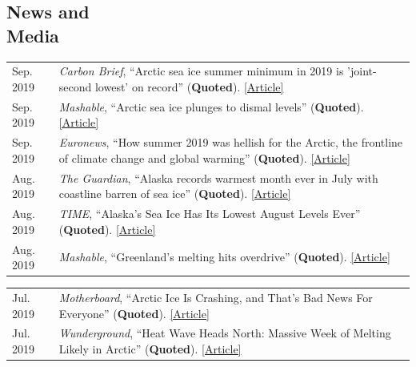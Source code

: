 \documentclass[margin,line,palatino,courier,10pt]{res}
\begin{document}
\begin{resume}
\section{\sc \textcolor{Cerulean}{\large{\textbf{News and\\ Media}}}}
\vspace*{0.04in}
\begin{tabular}{@{}p{0.9in}p{4in}}
Sep. 2019 & \textit{Carbon Brief}, ``Arctic sea ice summer minimum in 2019 is 'joint-second lowest' on record'' (\textbf{Quoted}). \href{https://www.carbonbrief.org/arctic-sea-ice-minimum-in-2019-is-joint-second-lowest-on-record}{[Article]}\\
Sep. 2019 & \textit{Mashable}, ``Arctic sea ice plunges to dismal levels'' (\textbf{Quoted}). \href{https://mashable.com/article/arctic-sea-ice-2019-melt/}{[Article]}\\
Sep. 2019 & \textit{Euronews}, ``How summer 2019 was hellish for the Arctic, the frontline of climate change and global warming'' (\textbf{Quoted}). \href{https://www.euronews.com/2019/09/18/how-2019-was-hellish-for-the-arctic-the-frontline-of-climate-change-and-global-warming}{[Article]}\\
Aug. 2019 & \textit{The Guardian}, ``Alaska records warmest month ever in July with coastline barren of sea ice'' (\textbf{Quoted}). \href{https://www.theguardian.com/us-news/2019/aug/08/alaska-warmest-month-ever-july-2019-sea-ice}{[Article]}\\
Aug. 2019 & \textit{TIME}, ``Alaska's Sea Ice Has Its Lowest August Levels Ever'' (\textbf{Quoted}). \href{https://time.com/5646168/alaska-sea-ice-melted/}{[Article]}\\
Aug. 2019 & \textit{Mashable}, ``Greenland's melting hits overdrive'' (\textbf{Quoted}). \href{https://mashable.com/article/greenland-melting-spike-climate-change/}{[Article]}\\
\end{tabular}
\begin{tabular}{@{}p{0.9in}p{4in}}
Jul. 2019 & \textit{Motherboard}, ``Arctic Ice Is Crashing, and That's Bad News For Everyone'' (\textbf{Quoted}). \href{https://www.vice.com/en_us/article/qv7gzm/arctic-ice-is-crashing-and-thats-bad-news-for-everyone}{[Article]}\\
Jul. 2019 & \textit{Wunderground}, ``Heat Wave Heads North: Massive Week of Melting Likely in Arctic'' (\textbf{Quoted}). \href{https://www.wunderground.com/cat6/Heat-Wave-Heads-North-Massive-Week-Melting-Likely-Arctic}{[Article]}\\

\end{tabular}
\end{resume}
\end{document}
